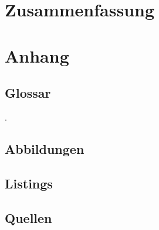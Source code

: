 \documentclass[12pt]{article}
\begin{document}
\section{Zusammenfassung}
\label{sec:zusammenfassung}


\newpage %

\cfoot{}
\section*{Anhang}
\label{sec:anhang}

\subsection*{Glossar}
\label{subsec:glossar}
\begingroup
\renewcommand{\section}[2]{}
\printglossary[style=tree]
\endgroup
\newpage

{\small\color{white}.}
\vspace{-2cm}
\subsection*{Abbildungen}
\label{subsec:abbildungen}
\begingroup
\renewcommand{\section}[2]{}
\listoffigures
\endgroup

\subsection*{Listings}
\label{subsec:listings}
\begingroup
\renewcommand{\section}[2]{}
\lstlistoflistings
\endgroup

\subsection*{Quellen}
\label{subsec:quellen}
\begingroup
\renewcommand{\section}[2]{}


\endgroup
\end{document}
